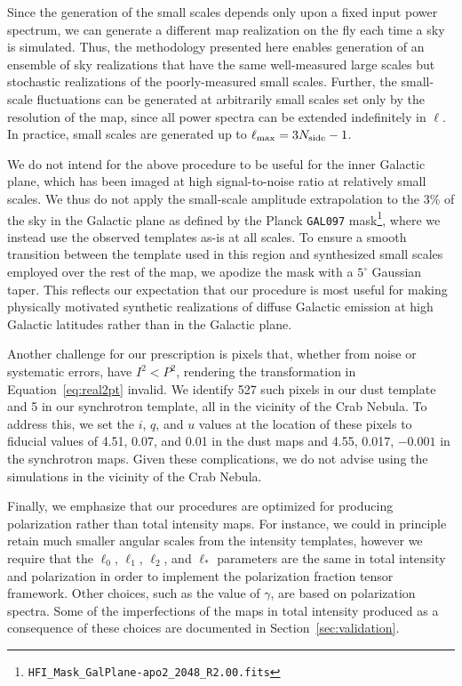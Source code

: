 \documentclass[twocolumn]{aastex631}
\begin{document}
Since the generation of the small scales depends only upon a fixed input power spectrum, we can generate a different map realization on the fly each time a sky is simulated. Thus, the methodology presented here enables generation of an ensemble of sky realizations that have the same well-measured large scales but stochastic realizations of the poorly-measured small scales. Further, the small-scale fluctuations can be generated at arbitrarily small scales set only by the resolution of the map, since all power spectra can be extended indefinitely in $\ell$. In practice, small scales are generated up to $\ell_{\rm max} = 3N_{\rm side}-1$.

We do not intend for the above procedure to be useful for the inner Galactic plane, which has been imaged at high signal-to-noise ratio at relatively small scales. We thus do not apply the small-scale amplitude extrapolation to the $3\%$ of the sky in the Galactic plane as defined by the Planck \texttt{GAL097} mask\footnote{\texttt{HFI\_Mask\_GalPlane-apo2\_2048\_R2.00.fits}}, where we instead use the observed templates as-is at all scales. To ensure a smooth transition between the template used in this region and synthesized small scales employed over the rest of the map, we apodize the mask with a $5^\circ$ Gaussian taper. This reflects our expectation that our procedure is most useful for making physically motivated synthetic realizations of diffuse Galactic emission at high Galactic latitudes rather than in the Galactic plane.

Another challenge for our prescription is pixels that, whether from noise or systematic errors, have $I^2 < P^2$, rendering the transformation in Equation~\ref{eq:real2pt} invalid. We identify 527 such pixels in our dust template and 5 in our synchrotron template, all in the vicinity of the Crab Nebula. To address this, we set the $i$, $q$, and $u$ values at the location of these pixels to fiducial values of 4.51, 0.07, and 0.01 in the dust maps and 4.55, 0.017, $-0.001$ in the synchrotron maps. Given these complications, we do not advise using the simulations in the vicinity of the Crab Nebula.

Finally, we emphasize that our procedures are optimized for producing polarization rather than total intensity maps. For instance, we could in principle retain much smaller angular scales from the intensity templates, however we require that the $\ell_0$, $\ell_1$, $\ell_2$, and $\ell_*$ parameters are the same in total intensity and polarization in order to implement the polarization fraction tensor framework. Other choices, such as the value of $\gamma$, are based on polarization spectra. Some of the imperfections of the maps in total intensity produced as a consequence of these choices are documented in Section~\ref{sec:validation}.
\end{document}
